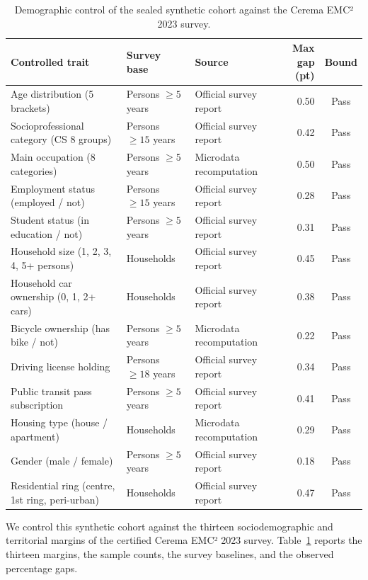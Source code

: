 \begin{table}[t]
\centering
\caption{Demographic control of the sealed synthetic cohort against the Cerema EMC² 2023 survey.}
\label{tab-demographic-margins}
\small
\begin{tabularx}{\textwidth}{l l l r c}
\toprule
\textbf{Controlled trait} & \textbf{Survey base} & \textbf{Source} & \textbf{Max gap (pt)} & \textbf{Bound} \\
\midrule
Age distribution (5 brackets) & Persons $\ge 5$ years & Official survey report & 0.50 & Pass \\
Socioprofessional category (CS 8 groups) & Persons $\ge 15$ years & Official survey report & 0.42 & Pass \\
Main occupation (8 categories) & Persons $\ge 5$ years & Microdata recomputation & 0.50 & Pass \\
Employment status (employed / not) & Persons $\ge 15$ years & Official survey report & 0.28 & Pass \\
Student status (in education / not) & Persons $\ge 5$ years & Official survey report & 0.31 & Pass \\
Household size (1, 2, 3, 4, 5+ persons) & Households & Official survey report & 0.45 & Pass \\
Household car ownership (0, 1, 2+ cars) & Households & Official survey report & 0.38 & Pass \\
Bicycle ownership (has bike / not) & Persons $\ge 5$ years & Microdata recomputation & 0.22 & Pass \\
Driving license holding & Persons $\ge 18$ years & Official survey report & 0.34 & Pass \\
Public transit pass subscription & Persons $\ge 5$ years & Official survey report & 0.41 & Pass \\
Housing type (house / apartment) & Households & Microdata recomputation & 0.29 & Pass \\
Gender (male / female) & Persons $\ge 5$ years & Official survey report & 0.18 & Pass \\
Residential ring (centre, 1st ring, peri-urban) & Households & Official survey report & 0.47 & Pass \\
\bottomrule
\end{tabularx}
\end{table}

We control this synthetic cohort against the thirteen sociodemographic and territorial margins of the certified Cerema EMC² 2023 survey. Table~\ref{tab-demographic-margins} reports the thirteen margins, the sample counts, the survey baselines, and the observed percentage gaps.





